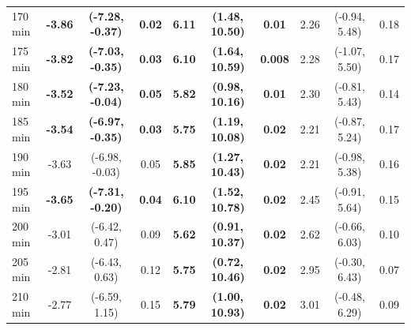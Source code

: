 \begin{table}[ht]
{\begin{tabular}{lccccccccc}
170 min & \textbf{-3.86} & \textbf{(-7.28, -0.37)} & \textbf{0.02} & \textbf{6.11} & \textbf{(1.48, 10.50)} & \textbf{0.01} & 2.26 & (-0.94, 5.48) & 0.18 \\
175 min & \textbf{-3.82} & \textbf{(-7.03, -0.35)} & \textbf{0.03} & \textbf{6.10} & \textbf{(1.64, 10.59)} & \textbf{0.008} & 2.28 & (-1.07, 5.50) & 0.17 \\
180 min & \textbf{-3.52} & \textbf{(-7.23, -0.04)} & \textbf{0.05} & \textbf{5.82} & \textbf{(0.98, 10.16)} & \textbf{0.01} & 2.30 & (-0.81, 5.43) & 0.14 \\
185 min & \textbf{-3.54} & \textbf{(-6.97, -0.35)} & \textbf{0.03} & \textbf{5.75} & \textbf{(1.19, 10.08)} & \textbf{0.02} & 2.21 & (-0.87, 5.24) & 0.17 \\
190 min & -3.63 & (-6.98, -0.03) & 0.05 & \textbf{5.85} & \textbf{(1.27, 10.43)} & \textbf{0.02} & 2.21 & (-0.98, 5.38) & 0.16 \\
195 min & \textbf{-3.65} & \textbf{(-7.31, -0.20)} & \textbf{0.04} & \textbf{6.10} & \textbf{(1.52, 10.78)} & \textbf{0.02} & 2.45 & (-0.91, 5.64) & 0.15 \\
200 min & -3.01 & (-6.42, 0.47) & 0.09 & \textbf{5.62} & \textbf{(0.91, 10.37)} & \textbf{0.02} & 2.62 & (-0.66, 6.03) & 0.10 \\
205 min & -2.81 & (-6.43, 0.63) & 0.12 & \textbf{5.75} & \textbf{(0.72, 10.46)} & \textbf{0.02} & 2.95 & (-0.30, 6.43) & 0.07 \\
210 min & -2.77 & (-6.59, 1.15) & 0.15 & \textbf{5.79} & \textbf{(1.00, 10.93)} & \textbf{0.02} & 3.01 & (-0.48, 6.29) & 0.09 \\
\bottomrule
\end{tabular}%
}
\end{table}
